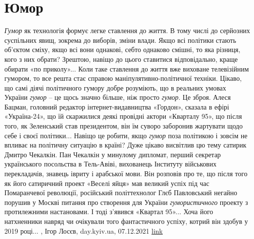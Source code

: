  
 
 
 
 
\chapter{Юмор}
\label{sec:slova.jumor}

\emph{Гумор} як технологія формує легке ставлення до життя. В тому числі до серйозних
суспільних явищ, зокрема до виборів, зміни влади. Якщо всі політики стають
об’єктом сміху, якщо всі вони однакові, себто однаково смішні, то яка різниця,
кого з них обрати? Зрештою, навіщо до цього ставитися відповідально, краще
обирати «по приколу»...  Коли таке ставлення до життя вже виховане телевізійним
гумором, то все решта стає справою маніпулятивно-політичної техніки.  Цікаво,
що самі діячі політичного гумору добре розуміють, що в реальних умовах України
\emph{гумор} – це щось значно більше, ніж просто \emph{гумор}. Це зброя. Алеся Бацман,
головний редактор інтернет-видавництва «Гордон», сказала в ефірі «Україна-24»,
що їй скаржилися деякі провідні актори «Кварталу 95», що після того, як
Зеленський став президентом, він їм суворо заборонив жартувати щодо себе і
своєї політики... Навіщо це робити, якщо \emph{гумор} поза політикою і зовсім не
впливає на політичну ситуацію в країні?  Дуже цікаво висвітлив цю тему сатирик
Дмитро Чекалкін. Пан Чекалкін у минулому дипломат, перший секретар українського
посольства в Тель-Авіві, вихованець Інституту військових перекладачів, знавець
івриту і арабської мови. Він розповів про те, що після того як його сатиричний
проект «Веселі яйця» мав великий успіх під час Помаранчевої революції,
російський політтехнолог Глєб Павловський негайно порушив у Москві питання про
створення для України \emph{гумористичного} проекту з протилежними настановами. І тоді
з’явився «Квартал 95»...  Хоча його натхненники навряд чи очікували того
фантастичного успіху, котрий він здобув у 2019 році...
, 
Ігор Лосєв, day.kyiv.ua, 07.12.2021
\href{https://day.kyiv.ua/uk/blog/polityka/gumor-yak-politychna-tehnologiya-ta-zbroya}{link}
